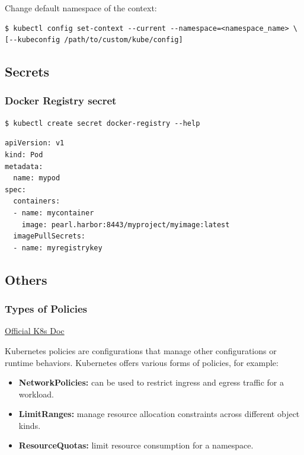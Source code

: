 \documentclass{article}
\newenvironment{codetemplate}[1][]{%
  \mybasecolorbox[#1]
  \itshape
}{%
  \endmybasecolorbox
}
\begin{document}
Change default namespace of the context:
\begin{codetemplate}
\begin{verbatim}
$ kubectl config set-context --current --namespace=<namespace_name> \
[--kubeconfig /path/to/custom/kube/config]
\end{verbatim}
\end{codetemplate}

\subsection{Secrets}
\subsubsection{Docker Registry secret}
\begin{codetemplate}{}
\begin{verbatim}
$ kubectl create secret docker-registry --help
\end{verbatim}
\end{codetemplate}
\begin{codetemplate}{}
\begin{verbatim}
apiVersion: v1
kind: Pod
metadata:
  name: mypod
spec:
  containers:
  - name: mycontainer
    image: pearl.harbor:8443/myproject/myimage:latest
  imagePullSecrets:
  - name: myregistrykey
\end{verbatim}
\end{codetemplate}

\subsection{Others}

\subsubsection{Types of Policies}
\href{https://kubernetes.io/docs/concepts/policy/}{Official K8s Doc}

Kubernetes policies are configurations that manage other configurations or runtime behaviors. Kubernetes offers various forms of policies, for example:

\begin{itemize}
    \item \textbf{NetworkPolicies:} can be used to restrict ingress and egress traffic for a workload.
    \item \textbf{LimitRanges:} manage resource allocation constraints across different object kinds.
    \item \textbf{ResourceQuotas:} limit resource consumption for a namespace.
\end{itemize}
\end{document}
